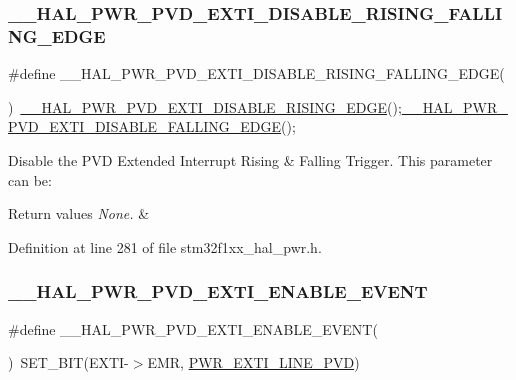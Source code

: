 \subsubsection{\texorpdfstring{\+\_\+\+\_\+\+H\+A\+L\+\_\+\+P\+W\+R\+\_\+\+P\+V\+D\+\_\+\+E\+X\+T\+I\+\_\+\+D\+I\+S\+A\+B\+L\+E\+\_\+\+R\+I\+S\+I\+N\+G\+\_\+\+F\+A\+L\+L\+I\+N\+G\+\_\+\+E\+D\+GE}{\_\_HAL\_PWR\_PVD\_EXTI\_DISABLE\_RISING\_FALLING\_EDGE}}
{\footnotesize\ttfamily \#define \+\_\+\+\_\+\+H\+A\+L\+\_\+\+P\+W\+R\+\_\+\+P\+V\+D\+\_\+\+E\+X\+T\+I\+\_\+\+D\+I\+S\+A\+B\+L\+E\+\_\+\+R\+I\+S\+I\+N\+G\+\_\+\+F\+A\+L\+L\+I\+N\+G\+\_\+\+E\+D\+GE(\begin{DoxyParamCaption}{ }\end{DoxyParamCaption})~\hyperlink{group___p_w_r___exported___macros_ga1ca8fd7f3286a176f6be540c75a004c6}{\+\_\+\+\_\+\+H\+A\+L\+\_\+\+P\+W\+R\+\_\+\+P\+V\+D\+\_\+\+E\+X\+T\+I\+\_\+\+D\+I\+S\+A\+B\+L\+E\+\_\+\+R\+I\+S\+I\+N\+G\+\_\+\+E\+D\+GE}();\hyperlink{group___p_w_r___exported___macros_ga1ca57168205f8cd8d1014e6eb9465f2d}{\+\_\+\+\_\+\+H\+A\+L\+\_\+\+P\+W\+R\+\_\+\+P\+V\+D\+\_\+\+E\+X\+T\+I\+\_\+\+D\+I\+S\+A\+B\+L\+E\+\_\+\+F\+A\+L\+L\+I\+N\+G\+\_\+\+E\+D\+GE}();}



Disable the P\+VD Extended Interrupt Rising \& Falling Trigger. This parameter can be\+: 


\begin{DoxyRetVals}{Return values}
{\em None.} & \\
\hline
\end{DoxyRetVals}


Definition at line 281 of file stm32f1xx\+\_\+hal\+\_\+pwr.\+h.

\mbox{\label{group___p_w_r___exported___macros_gae5ba5672fe8cb7c1686c7f2cc211b128}} 
\subsubsection{\texorpdfstring{\+\_\+\+\_\+\+H\+A\+L\+\_\+\+P\+W\+R\+\_\+\+P\+V\+D\+\_\+\+E\+X\+T\+I\+\_\+\+E\+N\+A\+B\+L\+E\+\_\+\+E\+V\+E\+NT}{\_\_HAL\_PWR\_PVD\_EXTI\_ENABLE\_EVENT}}
{\footnotesize\ttfamily \#define \+\_\+\+\_\+\+H\+A\+L\+\_\+\+P\+W\+R\+\_\+\+P\+V\+D\+\_\+\+E\+X\+T\+I\+\_\+\+E\+N\+A\+B\+L\+E\+\_\+\+E\+V\+E\+NT(\begin{DoxyParamCaption}{ }\end{DoxyParamCaption})~S\+E\+T\+\_\+\+B\+IT(E\+X\+TI-\/$>$E\+MR, \hyperlink{group___p_w_r___private___constants_ga43a49255649e03d2d2b6b12c5c379d2b}{P\+W\+R\+\_\+\+E\+X\+T\+I\+\_\+\+L\+I\+N\+E\+\_\+\+P\+VD})}



